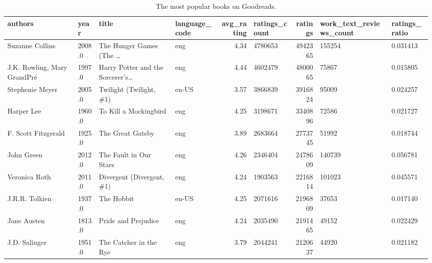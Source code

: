 \documentclass[11pt]{article}
\begin{document}
\begin{table}
\begin{tabular}{lHlHrHrHZ}
\toprule
                     authors &  year &                                              title & language\_code &  avg\_rating &  ratings\_count &  ratings &  work\_text\_reviews\_count &  ratings\_ratio \\
\midrule
             Suzanne Collins &                     2008.0 &            The Hunger Games (The \ldots &           eng &            4.34 &        4780653 &             4942365 &                   155254 &       0.031413 \\
 J.K. Rowling, Mary GrandPr\'e &                     1997.0 &  Harry Potter and the Sorcerer's\ldots &           eng &            4.44 &        4602479 &             4800065 &                    75867 &       0.015805 \\
             Stephenie Meyer &                     2005.0 &                            Twilight (Twilight, \#1) &         en-US &            3.57 &        3866839 &             3916824 &                    95009 &       0.024257 \\
                  Harper Lee &                     1960.0 &                              To Kill a Mockingbird &           eng &            4.25 &        3198671 &             3340896 &                    72586 &       0.021727 \\
         F. Scott Fitzgerald &                     1925.0 &                                   The Great Gatsby &           eng &            3.89 &        2683664 &             2773745 &                    51992 &       0.018744 \\
                  John Green &                     2012.0 &                             The Fault in Our Stars &           eng &            4.26 &        2346404 &             2478609 &                   140739 &       0.056781 \\
               Veronica Roth &                     2011.0 &                          Divergent (Divergent, \#1) &           eng &            4.24 &        1903563 &             2216814 &                   101023 &       0.045571 \\
              J.R.R. Tolkien &                     1937.0 &                                         The Hobbit &         en-US &            4.25 &        2071616 &             2196809 &                    37653 &       0.017140 \\
                 Jane Austen &                     1813.0 &                                Pride and Prejudice &           eng &            4.24 &        2035490 &             2191465 &                    49152 &       0.022429 \\
               J.D. Salinger &                     1951.0 &                             The Catcher in the Rye &           eng &            3.79 &        2044241 &             2120637 &                    44920 &       0.021182 \\
\bottomrule
\end{tabular}
    \caption[Most Rated Books]{The most popular books on Goodreads.}
     \label{tbl:most-rated-books}
\end{table}
        
\end{document}
